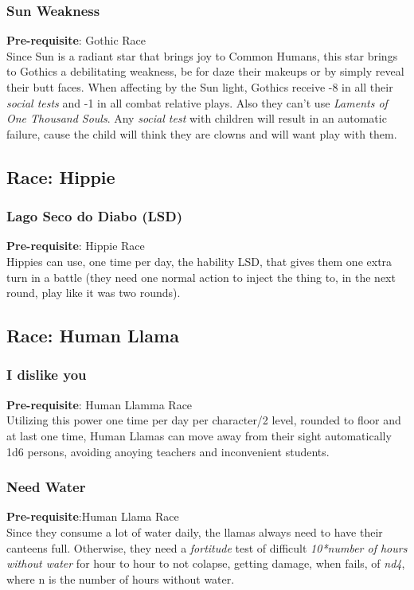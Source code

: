 \documentclass[ letterpaper,12pt]{article}
\begin{document}
\subsubsection{Sun Weakness}
 {\bf Pre-requisite}: Gothic Race\\
 Since Sun is a radiant star that brings joy to Common Humans, this star brings to Gothics a debilitating weakness, be for daze their makeups or by simply reveal their butt faces. When affecting by the Sun light, Gothics receive -8 in all their {\it social tests} and -1 in all {combat relative plays}. Also they can't use {\it Laments of One Thousand Souls}. Any {\it social test} with children will result in an automatic failure, cause the child will think they are clowns and will want play with them.

\subsection{Race: Hippie}

\subsubsection{Lago Seco do Diabo (LSD)}
{\bf Pre-requisite}: Hippie Race\\
Hippies can use, one time per day, the hability LSD, that gives them one extra turn in a battle (they need one normal action to inject the thing to, in the next round, play like it was two rounds).

\subsection{Race: Human Llama}

\subsubsection{I dislike you}
 {\bf Pre-requisite}: Human Llamma Race\\
Utilizing this power one time per day per character/2 level, rounded to floor and at last one time, Human Llamas can move away from their sight automatically 1d6 persons, avoiding anoying teachers and inconvenient students.

\subsubsection{Need Water}
{\bf Pre-requisite}:Human Llama Race\\
Since they consume a lot of water daily, the llamas always need to have their canteens full. Otherwise, they need a {\it fortitude} test of difficult {\it 10*number of hours without water} for hour to hour to not colapse, getting damage, when fails, of {\it nd4}, where n is the number of hours without water.
\end{document}
